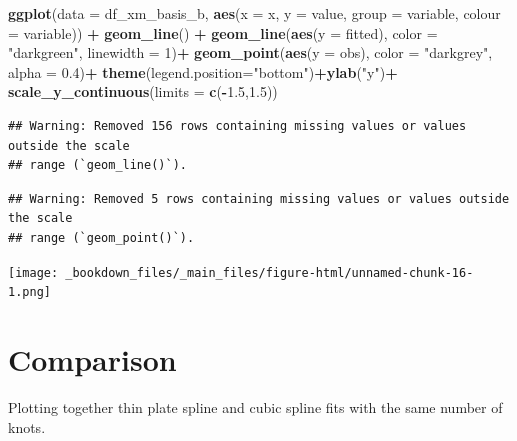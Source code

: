 \documentclass[
]{book}
\newenvironment{Shaded}{\begin{snugshade}}{\end{snugshade}}
\newcommand{\AttributeTok}[1]{\textcolor[rgb]{0.13,0.29,0.53}{#1}}
\newcommand{\DecValTok}[1]{\textcolor[rgb]{0.00,0.00,0.81}{#1}}
\newcommand{\FloatTok}[1]{\textcolor[rgb]{0.00,0.00,0.81}{#1}}
\newcommand{\FunctionTok}[1]{\textcolor[rgb]{0.13,0.29,0.53}{\textbf{#1}}}
\newcommand{\NormalTok}[1]{#1}
\newcommand{\SpecialCharTok}[1]{\textcolor[rgb]{0.81,0.36,0.00}{\textbf{#1}}}
\newcommand{\StringTok}[1]{\textcolor[rgb]{0.31,0.60,0.02}{#1}}
\begin{document}
\begin{Shaded}
\begin{Highlighting}[]
\FunctionTok{ggplot}\NormalTok{(}\AttributeTok{data =}\NormalTok{ df\_xm\_basis\_b, }\FunctionTok{aes}\NormalTok{(}\AttributeTok{x =}\NormalTok{ x, }\AttributeTok{y =}\NormalTok{ value, }\AttributeTok{group =}\NormalTok{ variable, }\AttributeTok{colour =}\NormalTok{ variable)) }\SpecialCharTok{+}
  \FunctionTok{geom\_line}\NormalTok{() }\SpecialCharTok{+} \FunctionTok{geom\_line}\NormalTok{(}\FunctionTok{aes}\NormalTok{(}\AttributeTok{y =}\NormalTok{ fitted), }\AttributeTok{color =} \StringTok{"darkgreen"}\NormalTok{, }\AttributeTok{linewidth =} \DecValTok{1}\NormalTok{)}\SpecialCharTok{+}
  \FunctionTok{geom\_point}\NormalTok{(}\FunctionTok{aes}\NormalTok{(}\AttributeTok{y =}\NormalTok{ obs), }\AttributeTok{color =} \StringTok{"darkgrey"}\NormalTok{, }\AttributeTok{alpha =} \FloatTok{0.4}\NormalTok{)}\SpecialCharTok{+}
  \FunctionTok{theme}\NormalTok{(}\AttributeTok{legend.position=}\StringTok{"bottom"}\NormalTok{)}\SpecialCharTok{+}\FunctionTok{ylab}\NormalTok{(}\StringTok{"y"}\NormalTok{)}\SpecialCharTok{+}
  \FunctionTok{scale\_y\_continuous}\NormalTok{(}\AttributeTok{limits =} \FunctionTok{c}\NormalTok{(}\SpecialCharTok{{-}}\FloatTok{1.5}\NormalTok{,}\FloatTok{1.5}\NormalTok{))}
\end{Highlighting}
\end{Shaded}

\begin{verbatim}
## Warning: Removed 156 rows containing missing values or values outside the scale
## range (`geom_line()`).
\end{verbatim}

\begin{verbatim}
## Warning: Removed 5 rows containing missing values or values outside the scale
## range (`geom_point()`).
\end{verbatim}

\texttt{[image: \_bookdown\_files/\_main\_files/figure-html/unnamed-chunk-16-1.png]}

\hypertarget{comparison}{%
\section{Comparison}\label{comparison}}

Plotting together thin plate spline and cubic spline fits with the same number of knots.
\end{document}

